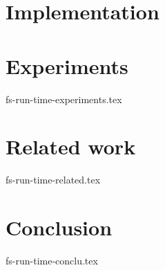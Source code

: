 \documentclass[sigconf]{acmart-edbt2018}
\begin{document}
\section {Implementation}


\section {Experiments}
 {fs-run-time-experiments.tex}

\section {Related work}
 {fs-run-time-related.tex}

\section {Conclusion}
 {fs-run-time-conclu.tex}



\end{document}
